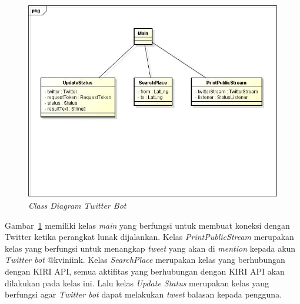 \begin{figure}[htbp]
	\centering
		\includegraphics{Gambar/diagramClass.jpg}
	\caption{\textit{Class Diagram Twitter Bot}}
	\label{fig:classdiagram}
\end{figure}

Gambar~\ref{fig:classdiagram} memiliki kelas \textit{main} yang berfungsi untuk membuat koneksi dengan Twitter ketika perangkat lunak dijalankan. Kelas \textit{PrintPublicStream} merupakan kelas yang berfungsi untuk menangkap \textit{tweet} yang akan di \textit{mention} kepada akun \textit{Twitter bot} @kviniink. Kelas \textit{SearchPlace} merupakan kelas yang berhubungan dengan KIRI API, semua aktifitas yang berhubungan dengan KIRI API akan dilakukan pada kelas ini. Lalu kelas \textit{Update Status} merupakan kelas yang berfungsi agar \textit{Twitter bot} dapat melakukan \textit{tweet} balasan kepada pengguna.
